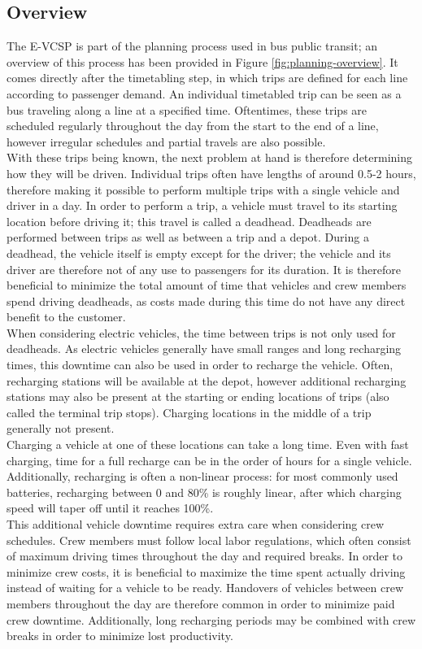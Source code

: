 \documentclass[]{article}
\begin{document}
\subsection{Overview}
The E-VCSP is part of the planning process used in bus public transit; an overview of this process has been provided in Figure \ref{fig:planning-overview}. It comes directly after the timetabling step, in which trips are defined for each line according to passenger demand. An individual timetabled trip can be seen as a bus traveling along a line at a specified time. Oftentimes, these trips are scheduled regularly throughout the day from the start to the end of a line, however irregular schedules and partial travels are also possible. \\
With these trips being known, the next problem at hand is therefore determining how they will be driven. Individual trips often have lengths of around 0.5-2 hours, therefore making it possible to perform multiple trips with a single vehicle and driver in a day. In order to perform a trip, a vehicle must travel to its starting location before driving it; this travel is called a deadhead. Deadheads are performed between trips as well as between a trip and a depot. During a deadhead, the vehicle itself is empty except for the driver; the vehicle and its driver are therefore not of any use to passengers for its duration. It is therefore beneficial to minimize the total amount of time that vehicles and crew members spend driving deadheads, as costs made during this time do not have any direct benefit to the customer. \\
When considering electric vehicles, the time between trips is not only used for deadheads. As electric vehicles generally have small ranges and long recharging times, this downtime can also be used in order to recharge the vehicle. Often, recharging stations will be available at the depot, however additional recharging stations may also be present at the starting or ending locations of trips (also called the terminal trip stops). Charging locations in the middle of a trip generally not present. \\
Charging a vehicle at one of these locations can take a long time. Even with fast charging, time for a full recharge can be in the order of hours for a single vehicle. Additionally, recharging is often a non-linear process: for most commonly used batteries, recharging between 0 and 80\% is roughly linear, after which charging speed will taper off until it reaches 100\%. \\
This additional vehicle downtime requires extra care when considering crew schedules. Crew members must follow local labor regulations, which often consist of maximum driving times throughout the day and required breaks. In order to minimize crew costs, it is beneficial to maximize the time spent actually driving instead of waiting for a vehicle to be ready. Handovers of vehicles between crew members throughout the day are therefore common in order to minimize paid crew downtime. Additionally, long recharging periods may be combined with crew breaks in order to minimize lost productivity. \\
\end{document}
